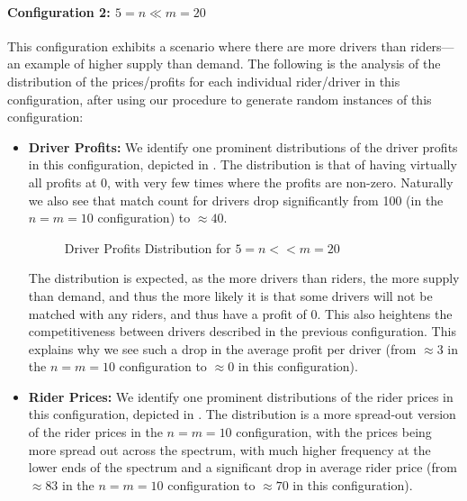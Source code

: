 \documentclass{article}
\begin{document}
\begin{enumerate}[label=(\alph*)]
\begin{itemize}
    \end{itemize}


    \paragraph{Configuration 2: $5 = n \ll m = 20$}
    This configuration exhibits a scenario where there are more drivers than riders---an example of higher supply than demand. The following is the analysis of the distribution of the prices/profits for each individual rider/driver in this configuration, after using our procedure to generate random instances of this configuration:

    \begin{itemize}
        \item \textbf{Driver Profits:} We identify one prominent distributions of the driver profits in this configuration, depicted in . The distribution is that of having virtually all profits at 0, with very few times where the profits are non-zero. Naturally we also see that match count for drivers drop significantly from 100 (in the $n = m = 10$ configuration) to $\approx 40$.
        
        \begin{figure}[H]
            \centering
            \resizebox{0.5\textwidth}{!}{}
            \caption{Driver Profits Distribution for $5 = n << m = 20$}
            \label{fig:q10b_n=5_m=20_dp}
        \end{figure}

        The distribution is expected, as the more drivers than riders, the more supply than demand, and thus the more likely it is that some drivers will not be matched with any riders, and thus have a profit of 0. This also heightens the competitiveness between drivers described in the previous configuration. This explains why we see such a drop in the average profit per driver (from $\approx 3$ in the $n = m = 10$ configuration to $\approx 0$ in this configuration).

        \item \textbf{Rider Prices:} We identify one prominent distributions of the rider prices in this configuration, depicted in . The distribution is a more spread-out version of the rider prices in the $n = m = 10$ configuration, with the prices being more spread out across the spectrum, with much higher frequency at the lower ends of the spectrum and a significant drop in average rider price (from $\approx 83$ in the $n = m = 10$ configuration to $\approx 70$ in this configuration).
        

\end{itemize}
\end{enumerate}
\end{document}
